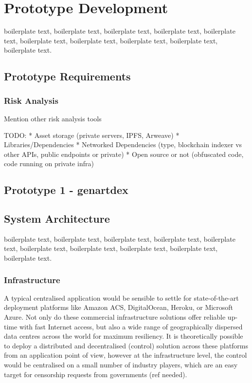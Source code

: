 \chapter{Prototype Development}


boilerplate text, boilerplate text, boilerplate text, boilerplate text, boilerplate text, boilerplate text, boilerplate text, boilerplate text, boilerplate text, boilerplate text.


\section {Prototype Requirements}

\subsection{Risk Analysis}

Mention other risk analysis tools \cite{l2beatL2BEATStateLayer2024}

TODO:
* Asset storage (private servers, IPFS, Arweave)
* Libraries/Dependencies
* Networked Dependencies (type, blockchain indexer vs other APIs, public endpoints or private)
* Open source or not (obfuscated code, code running on private infra)




\section {Prototype 1 - genartdex}

\section{System Architecture}

boilerplate text, boilerplate text, boilerplate text, boilerplate text, boilerplate text, boilerplate text, boilerplate text, boilerplate text, boilerplate text, boilerplate text.

\subsection{Infrastructure}

A typical centralised application would be sensible to settle for state-of-the-art deployment platforms like Amazon ACS, DigitalOcean, Heroku, or Microsoft Azure. Not only do these commercial infrastructure solutions offer reliable up-time with fast Internet access, but also a wide range of geographically dispersed data centres across the world for maximum resiliency. It is theoretically possible to deploy a distributed and decentralised (control) solution across these platforms from an application point of view, however at the infrastructure level, the control would be centralised on a small number of industry players, which are an easy target for censorship requests from governments (ref needed).

